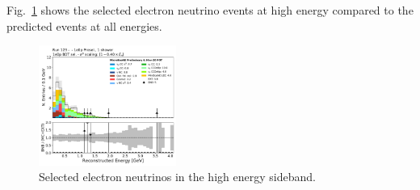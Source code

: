 Fig.~\ref{fig:1e0p:High_E_sideband:recoe_all} shows the selected electron neutrino events at high energy compared to the predicted events at all energies.

\begin{figure}[H]
    \centering
    \includegraphics[width=0.4\textwidth]{1e0p/High_E_Sideband/BDT_selection/reco_e_07272020.pdf}
    \caption{Selected electron neutrinos in the high energy sideband.}
    \label{fig:1e0p:High_E_sideband:recoe_all}
\end{figure}

